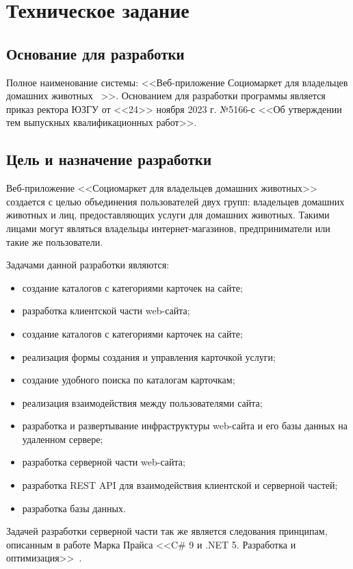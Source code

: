 \section{Техническое задание}
\subsection{Основание для разработки}

Полное наименование системы: <<Веб-приложение \textquotedbl Социомаркет для владельцев домашних животных \textquotedbl\ >>.
Основанием для разработки программы является приказ ректора ЮЗГУ от <<24>> ноября 2023 г. №5166-с <<Об утверждении тем выпускных квалификационных работ>>.

\subsection{Цель и назначение разработки}

Веб-приложение <<Социомаркет для владельцев домашних животных>> создается с целью объединения пользователей двух групп: владельцев домашних животных и лиц, предоставляющих услуги для домашних животных. Такими лицами могут являться владельцы интернет-магазинов, предприниматели или такие же пользователи.

Задачами данной разработки являются:
\begin{itemize}
\item создание каталогов с категориями карточек на сайте;
\item разработка клиентской части web-сайта;
\item создание каталогов с категориями карточек на сайте;
\item реализация формы создания и управления карточкой услуги;
\item создание удобного поиска по каталогам карточкам;
\item реализация взаимодействия между пользователями сайта;
\item разработка и развертывание инфраструктуры web-сайта и его базы данных на удаленном сервере;
\item разработка серверной части web-сайта;
\item разработка REST API для взаимодействия клиентской и серверной частей;
\item разработка базы данных.
\end{itemize}

Задачей разработки серверной части так же является следования принципам, описанным в работе Марка Прайса <<C\# 9 и .NET 5. Разработка и оптимизация>>~\cite{mark_price}.

